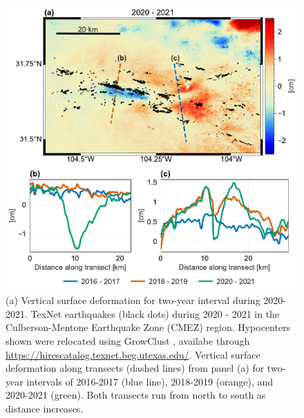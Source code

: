 \begin{figure}
	\centering
	\includegraphics[width=.98\textwidth]{figures/chapter5-lowess/figure-cmez-zoom-transect.pdf}
	\caption[Culberson-Mentone Earthquake Zone earthquakes during 2020 - 2021]{
		(a) Vertical surface deformation for two-year interval during 2020-2021. 
		TexNet earthquakes (black dots) during 2020 - 2021 in the Culberson-Mentone Earthquake Zone (CMEZ) region. Hypocenters shown were relocated using GrowClust \citep{Trugman2017GrowclustHierarchicalClustering}, availabe through \url{https://hirescatalog.texnet.beg.utexas.edu/}.
		Vertical surface deformation along transects (dashed lines) from panel (a) for two-year intervals of 2016-2017 (blue line), 2018-2019 (orange), and 2020-2021 (green). Both transects run from north to south as distance increases.
	}
	\label{fig:ch5-discuss-cmez-transects}
\end{figure}













